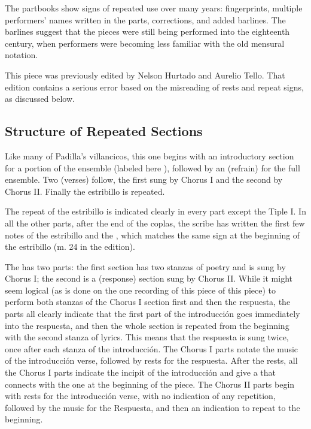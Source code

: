 The partbooks show signs of repeated use over many years: fingerprints, multiple performers' names written in the parts, corrections, and added barlines.
The barlines suggest that the pieces were still being performed into the eighteenth century, when performers were becoming less familiar with the old mensural notation.

This piece was previously edited by Nelson Hurtado and Aurelio Tello. 
That edition contains a serious error based on the misreading of rests and repeat signs, as discussed below. %

\subsection*{Structure of Repeated Sections}

Like many of Padilla's villancicos, this one begins with an introductory section for a portion of the ensemble (labeled here ), followed by an  (refrain) for the full ensemble. 
Two  (verses) follow, the first sung by Chorus I and the second by Chorus II. 
Finally the estribillo is repeated.

The repeat of the estribillo is indicated clearly in every part except the Tiple I.
In all the other parts, after the end of the coplas, the scribe has written the first few notes of the estribillo and the , which matches the same sign at the beginning of the estribillo (m. 24 in the edition).

The  has two parts: the first section has two stanzas of poetry and is sung by Chorus I; the second is a  (response) section sung by Chorus II.
While it might seem logical (as is done on the one recording of this piece\autocite{Padilla:HabanaCD} of this piece) to perform both stanzas of the Chorus I section first and then the respuesta, the parts all clearly indicate that the first part of the introducción goes immediately into the respuesta, and then the whole section is repeated from the beginning with the second stanza of lyrics.
This means that the respuesta is sung twice, once after each stanza of the introducción.
The Chorus I parts notate the music of the introducción verse, followed by rests for the respuesta. 
After the rests, all the Chorus I parts indicate the incipit of the introducción and give a  that connects with the one at the beginning of the piece.
The Chorus II parts begin with rests for the introducción verse, with no indication of any repetition, followed by the music for the Respuesta, and then an indication to repeat to the beginning.


